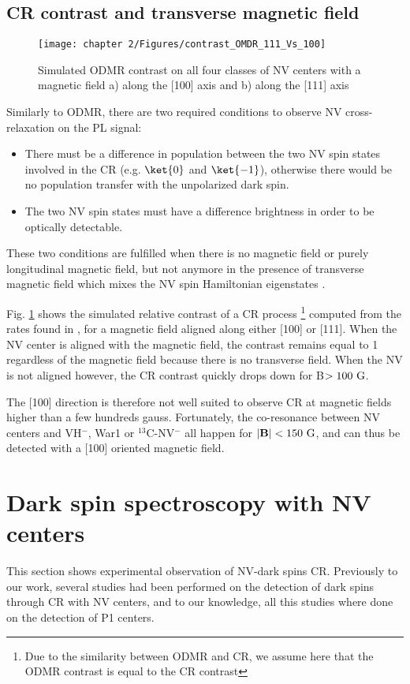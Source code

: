 \documentclass[a4paper, 11pt]{book}
\begin{document}
\subsection{CR contrast and transverse magnetic field}
\label{CR contrast}

\begin{figure}[h]
\centering
\texttt{[image: chapter 2/Figures/contrast\_OMDR\_111\_Vs\_100]}
\caption{Simulated ODMR contrast on all four classes of NV centers with a magnetic field a) along the [100] axis and b) along the [111] axis}
\label{121 vs 22 contrast}
\end{figure}

Similarly to ODMR, there are two required conditions to observe NV cross-relaxation on the PL signal: 
\begin{itemize}
\item There must be a difference in population between the two NV spin states involved in the CR (e.g. $\ket{0}$ and $\ket{-1}$), otherwise there would be no population transfer with the unpolarized dark spin.
\item The two NV spin states must have a difference brightness in order to be optically detectable.
\end{itemize}

These two conditions are fulfilled when there is no magnetic field or purely longitudinal magnetic field, but not anymore in the presence of transverse magnetic field which mixes the NV spin Hamiltonian eigenstates \citep{tetienne2012magnetic}.

Fig. \ref{121 vs 22 contrast} shows the simulated relative contrast of a CR process \footnote{Due to the similarity between ODMR and CR, we assume here that the ODMR contrast is equal to the CR contrast} computed from the rates found in \citep{tetienne2012magnetic}, for a magnetic field aligned along either [100] or [111]. When the NV center is aligned with the magnetic field, the contrast remains equal to 1 regardless of the magnetic field because there is no transverse field. When the NV is not aligned however, the CR contrast quickly drops down for B$>100\ \rm G$.

The [100] direction is therefore not well suited to observe CR at magnetic fields higher than a few hundreds gauss. Fortunately, the co-resonance between NV centers and VH$^-$, War1 or $^{13}$C-NV$^-$ all happen for $|\mathbf{B}| < 150 \ \rm G$, and can thus be detected with a [100] oriented magnetic field. 

\section{Dark spin spectroscopy with NV centers}
This section shows experimental observation of NV-dark spins CR. Previously to our work, several studies \citep{van1989cross, holliday1989optical, epstein2005anisotropic, armstrong2010nv,   hall2016detection, wickenbrock2016microwave,  wood2016wide,  alfasi2019detection, lazda2021cross} had been performed on the detection of dark spins through CR with NV centers, and to our knowledge, all this studies where done on the detection of P1 centers. 
\end{document}
